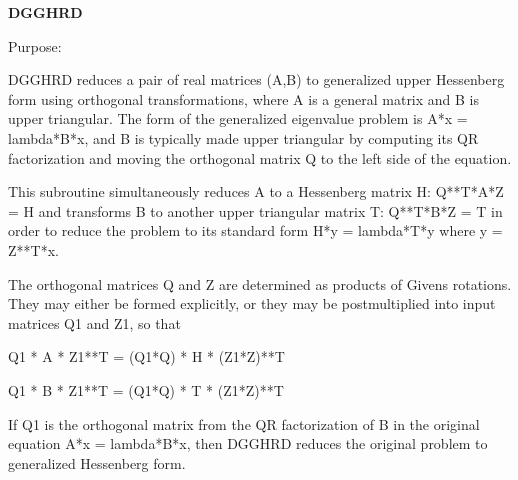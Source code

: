 {\bfseries D\+G\+G\+H\+R\+D} 

 \begin{DoxyParagraph}{Purpose\+: }
\begin{DoxyVerb} DGGHRD reduces a pair of real matrices (A,B) to generalized upper
 Hessenberg form using orthogonal transformations, where A is a
 general matrix and B is upper triangular.  The form of the
 generalized eigenvalue problem is
    A*x = lambda*B*x,
 and B is typically made upper triangular by computing its QR
 factorization and moving the orthogonal matrix Q to the left side
 of the equation.

 This subroutine simultaneously reduces A to a Hessenberg matrix H:
    Q**T*A*Z = H
 and transforms B to another upper triangular matrix T:
    Q**T*B*Z = T
 in order to reduce the problem to its standard form
    H*y = lambda*T*y
 where y = Z**T*x.

 The orthogonal matrices Q and Z are determined as products of Givens
 rotations.  They may either be formed explicitly, or they may be
 postmultiplied into input matrices Q1 and Z1, so that

      Q1 * A * Z1**T = (Q1*Q) * H * (Z1*Z)**T

      Q1 * B * Z1**T = (Q1*Q) * T * (Z1*Z)**T

 If Q1 is the orthogonal matrix from the QR factorization of B in the
 original equation A*x = lambda*B*x, then DGGHRD reduces the original
 problem to generalized Hessenberg form.\end{DoxyVerb}
 
\end{DoxyParagraph}

